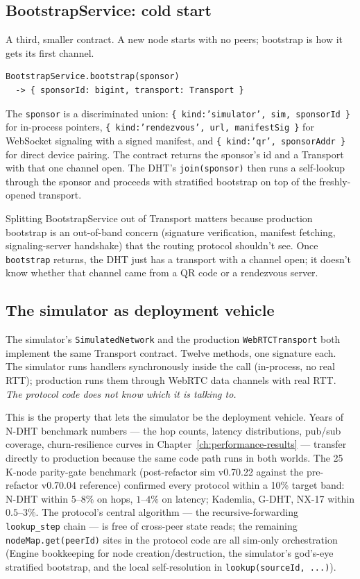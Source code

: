 \documentclass[twoside,nobib]{tufte-book}
\newcommand{\NDHT}{N-DHT\xspace}
\newcommand{\GDHT}{G-DHT\xspace}
\begin{document}
\subsection{BootstrapService: cold start}

A third, smaller contract. A new node starts with no peers;
bootstrap is how it gets its first channel.

\begin{verbatim}
BootstrapService.bootstrap(sponsor)
  -> { sponsorId: bigint, transport: Transport }
\end{verbatim}

The \texttt{sponsor} is a discriminated union:
\texttt{\{ kind:'simulator', sim, sponsorId \}} for in-process
pointers, \texttt{\{ kind:'rendezvous', url, manifestSig \}} for
WebSocket signaling with a signed manifest, and
\texttt{\{ kind:'qr', sponsorAddr \}} for direct device pairing.
The contract returns the sponsor's id and a Transport with that
one channel open. The DHT's \texttt{join(sponsor)} then runs a
self-lookup through the sponsor and proceeds with stratified
bootstrap on top of the freshly-opened transport.

Splitting BootstrapService out of Transport matters because
production bootstrap is an out-of-band concern (signature
verification, manifest fetching, signaling-server handshake)
that the routing protocol shouldn't see. Once \texttt{bootstrap}
returns, the DHT just has a transport with a channel open; it
doesn't know whether that channel came from a QR code or a
rendezvous server.

\subsection{The simulator as deployment vehicle}

The simulator's \texttt{SimulatedNetwork} and the production
\texttt{WebRTCTransport} both implement the same Transport
contract. Twelve methods, one signature each. The simulator
runs handlers synchronously inside the call (in-process, no
real RTT); production runs them through WebRTC data channels
with real RTT. \emph{The protocol code does not know which it
is talking to.}

This is the property that lets the simulator be the deployment
vehicle. Years of \NDHT benchmark numbers --- the hop counts,
latency distributions, pub/sub coverage, churn-resilience curves
in Chapter~\ref{ch:performance-results} --- transfer directly
to production because the same code path runs in both worlds.
The 25\,K-node parity-gate benchmark (post-refactor sim
v0.70.22 against the pre-refactor v0.70.04 reference) confirmed
every protocol within a 10\% target band: \NDHT within
$5$--$8\%$ on hops, $1$--$4\%$ on latency; Kademlia, \GDHT,
NX-17 within $0.5$--$3\%$. The protocol's central algorithm ---
the recursive-forwarding \texttt{lookup\_step} chain --- is
free of cross-peer state reads; the remaining
\texttt{nodeMap.get(peerId)} sites in the protocol code are
all sim-only orchestration (Engine bookkeeping for node
creation/destruction, the simulator's god's-eye stratified
bootstrap, and the local self-resolution in
\texttt{lookup(sourceId, ...)}).
\end{document}

